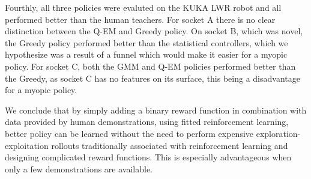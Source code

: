 \documentclass[final,5p,times,twocolumn]{elsarticle}
\begin{document}
Fourthly, all three policies were evaluted on the KUKA LWR robot and all performed better than the human 
teachers. For socket A there is no clear distinction between 
the Q-EM and Greedy policy. On socket B, which was novel, the Greedy policy performed better than the statistical controllers, 
which we hypothesize was a result of a funnel which would make it easier for a myopic policy. For socket C, both the 
GMM and Q-EM policies performed better than the Greedy, as socket C has no features on its surface, this being a disadvantage 
for a myopic policy.

We conclude that by simply adding a binary reward function in combination with 
data provided by human demonstrations, using fitted reinforcement learning, better policy can be learned without 
the need to perform expensive exploration-exploitation rollouts traditionally associated with reinforcement learning and 
designing complicated reward functions. This is especially advantageous when only a few demonstrations are available.


\FloatBarrier
 

\end{document}

